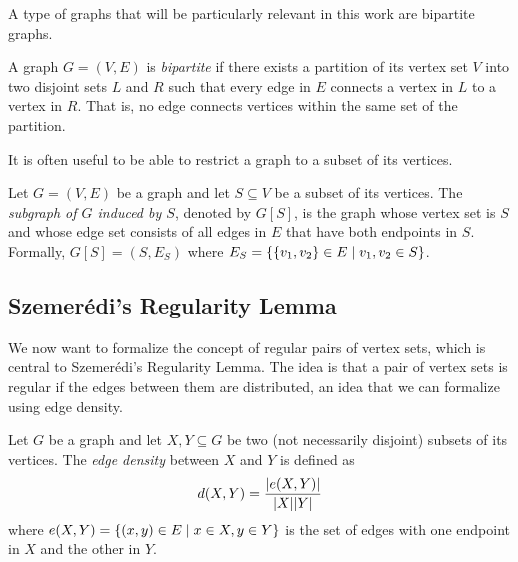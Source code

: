         A type of graphs that will be particularly relevant in this work are bipartite graphs.

        \begin{definition}
            A graph $G = (V, E)$ is \emph{bipartite} if there exists a partition of its vertex set $V$ into two disjoint sets
            $L$ and $R$ such that every edge in $E$ connects a vertex in $L$ to a vertex in $R$.
            That is, no edge connects vertices within the same set of the partition.
        \end{definition}

        It is often useful to be able to restrict a graph to a subset of its vertices.

        \begin{definition}
            Let $G = (V, E)$ be a graph and let $S \subseteq V$ be a subset of its vertices.
            The \emph{subgraph of $G$ induced by $S$}, denoted by $G[S]$, is the graph whose vertex set is $S$ and whose edge
            set consists of all edges in $E$ that have both endpoints in $S$.
            Formally, $G[S] = (S, E_S)$ where $E_S = \{ \{ v_1, v_2 \} \in E \mid v_1, v_2 \in S \}$.
        \end{definition}

    \subsection{Szemer\'edi's Regularity Lemma} \label{subsec:subsection_2.2}
        We now want to formalize the concept of regular pairs of vertex sets, which is central to Szemer\'edi's Regularity Lemma.
        The idea is that a pair of vertex sets is regular if the edges between them are  distributed,
        an idea that we can formalize using edge density.

        \begin{definition}
            Let $G$ be a graph and let $X, Y \subseteq G$ be two (not necessarily disjoint) subsets of its vertices.
            The \emph{edge density} between $X$ and $Y$ is defined as
            \[
                d(X, Y) = \frac{| e(X, Y) |}{|X| |Y|}
            \]
            where $e(X, Y) = \{ ( x, y ) \in E \mid x \in X, y \in Y \}$ is the set of edges with one endpoint in
            $X$ and the other in $Y$.
        \end{definition}

